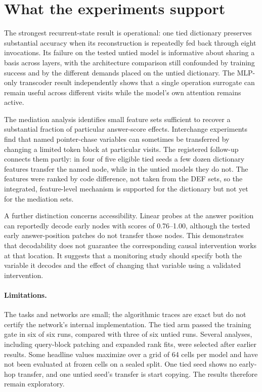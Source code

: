 \documentclass[10pt,letterpaper]{article}
\begin{document}
\section{What the experiments support}\label{sec:discussion}
The strongest recurrent-state result is operational: one tied dictionary preserves substantial accuracy when its reconstruction is repeatedly fed back through eight invocations. Its failure on the tested untied model is informative about sharing a basis across layers, with the architecture comparison still confounded by training success and by the different demands placed on the untied dictionary. The MLP-only transcoder result independently shows that a single operation surrogate can remain useful across different visits while the model's own attention remains active.

The mediation analysis identifies small feature sets sufficient to recover a substantial fraction of particular answer-score effects. Interchange experiments find that named pointer-chase variables can sometimes be transferred by changing a limited token block at particular visits. The registered follow-up connects them partly: in four of five eligible tied seeds a few dozen dictionary features transfer the named node, while in the untied models they do not. The features were ranked by code difference, not taken from the DEF sets, so the integrated, feature-level mechanism is supported for the dictionary but not yet for the mediation sets.

A further distinction concerns accessibility. Linear probes at the answer position can reportedly decode early nodes with scores of 0.76--1.00, although the tested early answer-position patches do not transfer those nodes. This demonstrates that decodability does not guarantee the corresponding causal intervention works at that location. It suggests that a monitoring study should specify both the variable it decodes and the effect of changing that variable using a validated intervention.

\paragraph{Limitations.} The tasks and networks are small; the algorithmic traces are exact but do not certify the network's internal implementation. The tied arm passed the training gate in six of six runs, compared with three of six untied runs. Several analyses, including query-block patching and expanded rank fits, were selected after earlier results. Some headline values maximize over a grid of 64 cells per model and have not been evaluated at frozen cells on a sealed split. One tied seed shows no early-hop transfer, and one untied seed's transfer is start copying. The results therefore remain exploratory.
\end{document}
